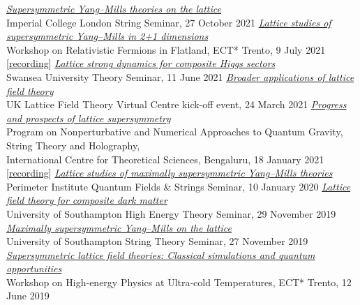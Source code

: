 \begin{spacelist}
\begin{revnumerate}
    \pagebreakitem
      \textit{\href{http://www.davidschaich.net/talks/2110Imperial.pdf}{Supersymmetric Yang--Mills theories on the lattice}} \\
      Imperial College London String Seminar, 27 October 2021
    \pagebreakitem
      \textit{\href{http://www.davidschaich.net/talks/2107ECT.pdf}{Lattice studies of supersymmetric Yang--Mills in 2+1 dimensions}} \\
      Workshop on Relativistic Fermions in Flatland, ECT* Trento, 9 July 2021 [\href{https://www.youtube.com/watch?v=8ADzjGS2n8Q&t=2900s}{recording}]
    \pagebreakitem
      \textit{\href{http://www.davidschaich.net/talks/2106Swansea.pdf}{Lattice strong dynamics for composite Higgs sectors}} \\
      Swansea University Theory Seminar, 11 June 2021
    \pagebreakitem
      \textit{\href{http://www.davidschaich.net/talks/2103UKLFT.pdf}{Broader applications of lattice field theory}} \\
      UK Lattice Field Theory Virtual Centre kick-off event, 24 March 2021
    \pagebreakitem
      \textit{\href{http://www.davidschaich.net/talks/2101Bangalore.pdf}{Progress and prospects of lattice supersymmetry}} \\
      Program on Nonperturbative and Numerical Approaches to Quantum Gravity, String Theory and Holography, \\ International Centre for Theoretical Sciences, Bengaluru, 18 January 2021 [\href{https://www.youtube.com/watch?v=F11ubzWoHAc}{recording}]
    \pagebreakitem
      \textit{\href{http://www.davidschaich.net/talks/2001Perimeter.pdf}{Lattice studies of maximally supersymmetric Yang--Mills theories}} \\
      Perimeter Institute Quantum Fields \& Strings Seminar, 10 January 2020
    \pagebreakitem
      \textit{\href{http://www.davidschaich.net/talks/1911Soton_DM.pdf}{Lattice field theory for composite dark matter}} \\
      University of Southampton High Energy Theory Seminar, 29 November 2019
    \pagebreakitem
      \textit{\href{http://www.davidschaich.net/talks/1911Soton_susy.pdf}{Maximally supersymmetric Yang--Mills on the lattice}} \\
      University of Southampton String Theory Seminar, 27 November 2019
    \pagebreakitem
      \textit{\href{http://www.davidschaich.net/talks/1906ECT.pdf}{Supersymmetric lattice field theories: Classical simulations and quantum opportunities}} \\
      Workshop on High-energy Physics at Ultra-cold Temperatures, ECT* Trento, 12 June 2019

\end{revnumerate}
\end{spacelist}
